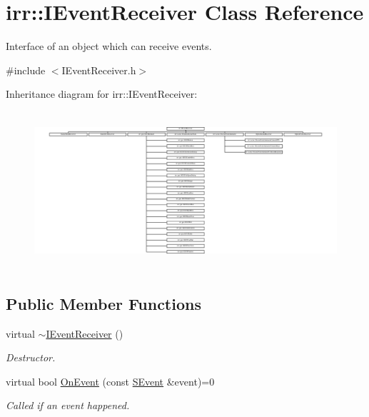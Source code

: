 \hypertarget{classirr_1_1IEventReceiver}{}\section{irr\+:\+:I\+Event\+Receiver Class Reference}
\label{classirr_1_1IEventReceiver}


Interface of an object which can receive events.  




{\ttfamily \#include $<$I\+Event\+Receiver.\+h$>$}

Inheritance diagram for irr\+:\+:I\+Event\+Receiver\+:\begin{figure}[H]
\begin{center}
\leavevmode
\includegraphics[height=5.847177cm]{classirr_1_1IEventReceiver}
\end{center}
\end{figure}
\subsection*{Public Member Functions}
\begin{DoxyCompactItemize}
\item 
\mbox{\label{classirr_1_1IEventReceiver_a4ec011612f02017d95654cf5b5d567b6}} 
virtual \hyperlink{classirr_1_1IEventReceiver_a4ec011612f02017d95654cf5b5d567b6}{$\sim$\+I\+Event\+Receiver} ()
\begin{DoxyCompactList}\small\item\em Destructor. \end{DoxyCompactList}\item 
virtual bool \hyperlink{classirr_1_1IEventReceiver_a571f744ceffc3b4fe8a81f529163eb97}{On\+Event} (const \hyperlink{structirr_1_1SEvent}{S\+Event} \&event)=0
\begin{DoxyCompactList}\small\item\em Called if an event happened. \end{DoxyCompactList}\end{DoxyCompactItemize}


